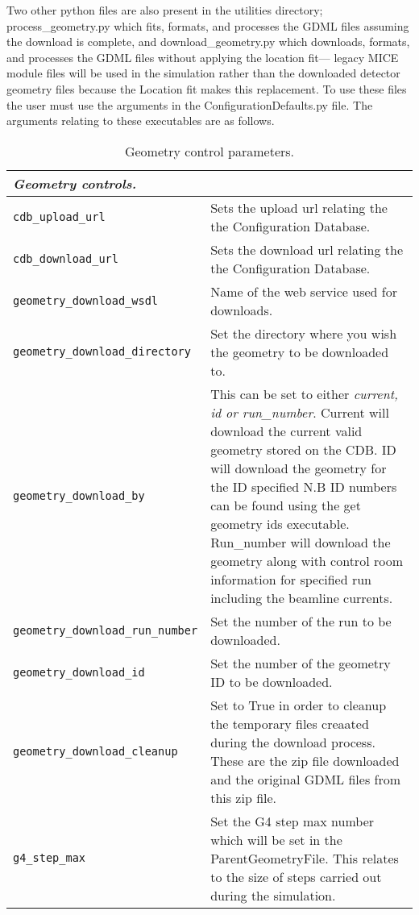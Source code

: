 Two other python files are also present in the utilities directory; process\_geometry.py which fits, formats, and processes the GDML files assuming the download is complete, and download\_geometry.py which downloads, formats, and processes the GDML files without applying the location fit--- legacy MICE module files will be used in the simulation rather than the downloaded detector geometry files because the Location fit makes this replacement. To use these files the user must use the arguments in the ConfigurationDefaults.py file. The arguments relating to these executables are as follows.

\begin{table*}
\begin{center}
\caption{Geometry control parameters.}
\begin{tabularx}{\textwidth}{lX}
\hline
\multicolumn{2}{l}{\emph{Geometry controls.}} \\
\hline
\verb|cdb_upload_url| & Sets the upload url relating the the Configuration Database.\\
\verb|cdb_download_url| & Sets the download url relating the the Configuration Database.\\
\verb|geometry_download_wsdl| & Name of the web service used for downloads.\\
\verb|geometry_download_directory| & Set the directory where you wish the geometry to be downloaded to.\\
\verb|geometry_download_by| & This can be set to either \textit{current, id or run\_number}. Current will download the current valid geometry stored
on the CDB. ID will download the geometry for the ID specified N.B ID numbers can be found using the get geometry ids executable. Run\_number will
download the geometry along with control room information for specified run including the beamline currents. \\ 
\verb|geometry_download_run_number| & Set the number of the run to be downloaded.\\
\verb|geometry_download_id| & Set the number of the geometry ID to be downloaded.\\
\verb|geometry_download_cleanup| & Set to True in order to cleanup the temporary files creaated during the download process. These are the zip file
downloaded and the original GDML files from this zip file.\\
\verb|g4_step_max| & Set the G4 step max number which will be set in the ParentGeometryFile. This relates to the size of steps carried out during
the simulation.\\

\end{tabularx}
\end{center}
\end{table*}
